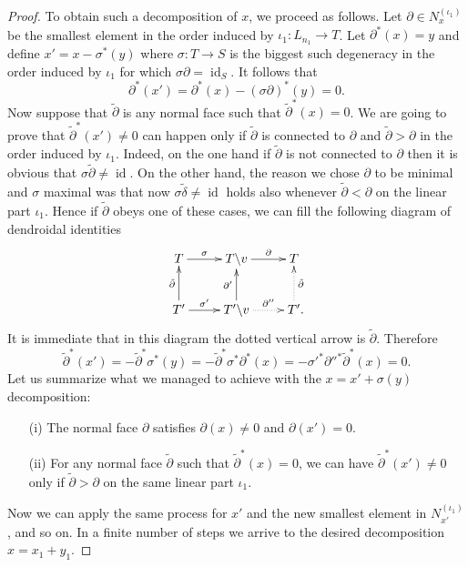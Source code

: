 \documentclass[a4paper]{amsart}
\theoremstyle{plain}
\theoremstyle{definition}
\theoremstyle{remark}
\DeclareMathOperator{\id}{id}
\newcommand{\To}{\longrightarrow}
\numberwithin{equation}{section}
\numberwithin{figure}{section}
\begin{document}
\begin{proof}
    To obtain such a decomposition of $x$, we proceed as follows. Let $\partial\in N_x^{(\iota_1)}$
    be the smallest element in the order induced by $\iota_1\colon L_{n_1}\To T$. Let $\partial^*(x)=y$ and define $x'=x-\sigma^*(y)$ where $\sigma\colon T\to S$ is the
    biggest such degeneracy in the order induced by $\iota_1$ for which $\sigma\partial=\id_{S}$.
    It follows that
    \[
        \partial^*(x')=\partial^*(x)-(\sigma\partial)^*(y)=0.
    \]
    Now suppose that $\tilde\partial$ is any normal face such that $\tilde\partial^*(x)=0$. We are going to prove that $\tilde\partial^*(x')\neq 0$ can happen only if $\tilde\partial$ is connected to $\partial$ and $\tilde\partial> \partial$ in the order induced by $\iota_1$.
    Indeed, on the one hand if $\tilde\partial$ is not connected to $\partial$ then it is obvious that $\sigma\tilde\partial\ne\id$. On the other hand, the reason we chose $\partial$ to be minimal and $\sigma$ maximal was that now $\sigma\tilde\delta\ne\id$ holds also whenever $\tilde\partial<\partial$ on the linear part $\iota_1$. Hence if $\tilde\partial$ obeys one of these cases, we can fill the following diagram of dendroidal identities
    \[
        \xymatrix{T\ar[r]^-{\sigma} &T\backslash v\ar[r]^-{\partial} &T\\
        T'\ar[u]^-{\tilde\partial}\ar[r]^-{\sigma'} &T'\backslash
        v\ar[u]^-{\partial'}\ar@{.>}[r]^-{\partial''} &T'{\rlap .}\ar@{.>}[u]_-{\tilde\partial}}
    \]
    It is immediate that in this diagram the dotted vertical arrow is $\tilde\partial$. Therefore
    \[
        \tilde\partial^*(x')=-\tilde\partial^*\sigma^*(y)=-\tilde\partial^*\sigma^*\partial^*(x)=-\sigma'^*\partial''^*
        \tilde\partial^*(x)=0.
    \]
    Let us summarize what we managed to achieve with the $x=x'+\sigma(y)$ decomposition:
    \begin{itemize}
        \item[{\rm (i)}] The normal face $\partial$ satisfies $\partial(x)\ne 0$ and $\partial(x')=0$.
        \item[{\rm (ii)}] For any normal face $\tilde\partial$ such that $\tilde\partial^*(x)=0$, we can have $\tilde\partial^*(x')\neq 0$ only if $\tilde\partial> \partial$ on the same linear part $\iota_1$.
    \end{itemize}
    Now we can apply the same process for $x'$ and the new smallest element in $N_{x'}^{(\iota_1)}$, and so on. In a finite number of steps we arrive to the desired decomposition $x=x_1+y_1$.
\end{proof}
\end{document}
